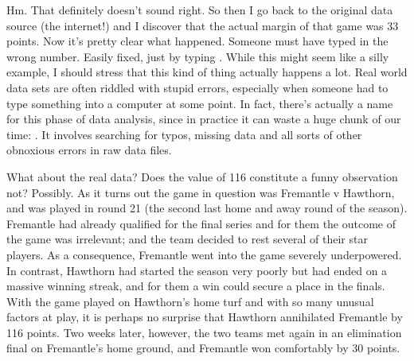 Hm. That definitely doesn't sound right. So then I go back to the original data source (the internet!) and I discover that the actual margin of that game was 33 points. Now it's pretty clear what happened. Someone must have typed in the wrong number. Easily fixed, just by typing .   While this might seem like a silly example, I should stress that this kind of thing actually happens a lot. Real world data sets are often riddled with stupid errors, especially when someone had to type something into a computer at some point. In fact, there's actually a name for this phase of data analysis, since in practice it can waste a huge chunk of our time: . It involves searching for typos, missing data and all sorts of other obnoxious errors in raw data files.  

What about the real data? Does the value of 116 constitute a funny observation not? Possibly. As it turns out the game in question was Fremantle v Hawthorn, and was played in round 21 (the second last home and away round of the season). Fremantle had already qualified for the final series and for them the outcome of the game was irrelevant; and the team decided to rest several of their star players. As a consequence, Fremantle went into the game severely underpowered. In contrast, Hawthorn had started the season very poorly but had ended on a massive winning streak, and for them a win could secure a place in the finals. With the game played on Hawthorn's home turf and with so many unusual factors at play, it is perhaps no surprise that Hawthorn annihilated Fremantle by 116 points. Two weeks later, however, the two teams met again in an elimination final on Fremantle's home ground, and Fremantle won comfortably by 30 points.

